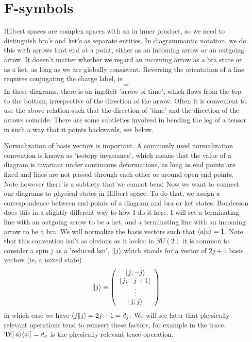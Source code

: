 \documentclass[12pt]{article}
\begin{document}
\section{F-symbols}

Hilbert spaces are complex spaces with an in inner product, so we need to distinguish
bra's and ket's as separate entities. In diagrammantic notation, we do this with
arrows that end at a point, either as an incoming arrow or an outgoing arrow.
It doesn't matter whether we regard an incoming arrow as a bra state
or as a ket, as long as we are globally consistent. Reversing the orientation of a line
requires conjugating the charge label, ie
\begin{equation}
\begin{gathered}

\end{gathered}
=
\begin{gathered}

\end{gathered}
\end{equation}
In these diagrams, there is an implicit 'arrow of time', which flows from the top to the bottom,
irrespective of the direction of the arrow. Often it is convenient to use the above relation such
that the direction of 'time' and the direction of the arrows coincide. There are some subtleties
involved in bending the leg of a tensor in such a way that it points backwards, see below.

Normalization of basis vectors is important. A commonly used normalization convention
is known as `isotopy invariance', which means that the value of a diagram is invariant under continuous
deformations, as long as end points are fixed and lines are not passed through each other or around
open end points. Note however there is a subtlety that we cannot bend 
Now we want to connect our diagrams to physical states in Hilbert space.
To do that, we assign a correspondence between end points of a diagram and bra or ket states.
Bonderson\cite{Bonderson} does this in a slightly different way to how I do it here.
I will set a terminating line with an outgoing arrow to be a ket, and a terminating line
with an incoming arrow to be a bra. We will normalize the basis vectors such that
$\langle a | a \rangle = 1$. Note that
this convention isn't as obvious as it looks: in $SU(2)$ it is common to consider a spin $j$ as a 
'reduced ket', $\| j \rangle$ which stands for a vector of $2j+1$ basis vectors (ie, a mixed state)
\begin{equation}
\| j \rangle \equiv \left( \begin{array}{c} \hbox{$\mid \! {j;-j} \rangle$} \\ \hbox{$\mid \! {j;-j+1} \rangle$} \\ \vdots
\\ \hbox{$\mid \! {j;j} \rangle$} \end{array} \right)
\end{equation}
in which case we have $\langle j \| j \rangle = 2j+1 = d_j$. 
We will see later that physically relevant operations tend to reinsert these factors, for
example in the trace, $\mathop{\rm Tr} [ \hbox{$\mid \! {a} \rangle$} \langle a | ] = d_a$ is the physically relevant trace operation.
\end{document}
